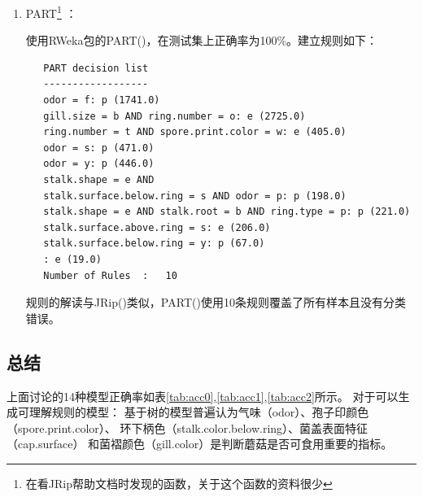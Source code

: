 \documentclass[lang=cn,11pt,a4paper,cite=super]{elegantpaper}
\begin{document}
\begin{enumerate}
\item PART\footnote{在看JRip帮助文档时发现的函数，关于这个函数的资料很少} ：
\par 使用RWeka包的PART()，在测试集上正确率为100\%。建立规则如下：
\begin{lstlisting}
   PART decision list
   ------------------  
   odor = f: p (1741.0)
   gill.size = b AND ring.number = o: e (2725.0)
   ring.number = t AND spore.print.color = w: e (405.0)
   odor = s: p (471.0)
   odor = y: p (446.0)
   stalk.shape = e AND
   stalk.surface.below.ring = s AND odor = p: p (198.0)
   stalk.shape = e AND stalk.root = b AND ring.type = p: p (221.0)
   stalk.surface.above.ring = s: e (206.0)
   stalk.surface.below.ring = y: p (67.0)
   : e (19.0)
   Number of Rules  : 	10
\end{lstlisting}
规则的解读与JRip()类似，PART()使用10条规则覆盖了所有样本且没有分类错误。
\end{enumerate}

\subsection{总结}
上面讨论的14种模型正确率如表\ref{tab:acc0},\ref{tab:acc1},\ref{tab:acc2}所示。 
对于可以生成可理解规则的模型：
基于树的模型普遍认为气味（odor）、孢子印颜色（spore.print.color）、
环下柄色（stalk.color.below.ring）、菌盖表面特征（cap.surface）
和菌褶颜色（gill.color）是判断蘑菇是否可食用重要的指标。
\begin{table}[htb]
   \centering   
   \caption{降维模型正确率}
   \label{tab:acc0}
\end{table}

\begin{table}[htb]
   \centering
   \caption{树模型正确率}
   \label{tab:acc1}
\end{table}
\end{document}
